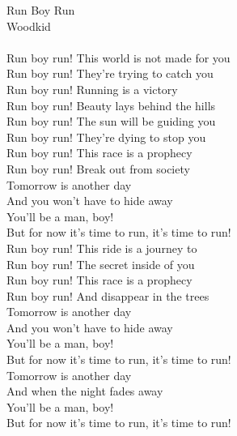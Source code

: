 \documentclass{article}
\begin{document}
Run Boy Run\\
Woodkid\\
\\
Run boy run! This world is not made for you\\
Run boy run! They’re trying to catch you\\
Run boy run! Running is a victory\\
Run boy run! Beauty lays behind the hills\\
Run boy run! The sun will be guiding you\\
Run boy run! They’re dying to stop you\\
Run boy run! This race is a prophecy\\
Run boy run! Break out from society\\
Tomorrow is another day\\
And you won’t have to hide away\\
You’ll be a man, boy!\\
But for now it’s time to run, it’s time to run!\\
Run boy run! This ride is a journey to\\
Run boy run! The secret inside of you\\
Run boy run! This race is a prophecy\\
Run boy run! And disappear in the trees\\
Tomorrow is another day\\
And you won’t have to hide away\\
You’ll be a man, boy!\\
But for now it’s time to run, it’s time to run!\\
Tomorrow is another day\\
And when the night fades away\\
You’ll be a man, boy!\\
But for now it’s time to run, it’s time to run!\\
\end{document}
